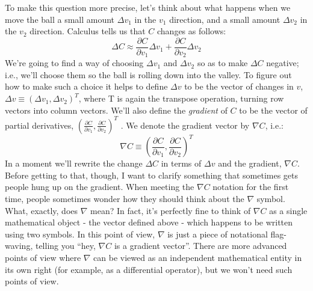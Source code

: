 To make this question more precise, let's think about what happens when we move the ball a small amount $\Delta v_1$ in the $v_1$ direction, and a small amount $\Delta v_2$ in the $v_2$ direction. Calculus tells us that $C$ changes as follows: 
\begin{equation}
\Delta C \approx \frac{\partial C}{\partial v_{1}} \Delta v_{1}+\frac{\partial C}{\partial v_{2}} \Delta v_{2}
\label{eq:deltaC01}
\end{equation}
We're going to find a way of choosing $\Delta v_1$ and $\Delta v_2$ so as to make $\Delta C$ negative; i.e., we'll choose them so the ball is rolling down into the valley. To figure out how to make such a choice it helps to define $\Delta v$ to be the vector of changes in $v$, $\Delta v \equiv\left(\Delta v_{1}, \Delta v_{2}\right)^{T}$, where T is again the transpose operation, turning row vectors into column vectors. We'll also define the \textit{gradient} of $C$ to be the vector of partial derivatives, $\left(\frac{\partial C}{\partial v_{1}}, \frac{\partial C}{\partial v_{2}}\right)^{T}$ . We denote the gradient vector by $\nabla C$, i.e.: 
\begin{equation}
\nabla C \equiv\left(\frac{\partial C}{\partial v_{1}}, \frac{\partial C}{\partial v_{2}}\right)^{T}
\end{equation}
In a moment we'll rewrite the change $\Delta C$ in terms of $\Delta v$ and the gradient, $\nabla C$. Before getting to that, though, I want to clarify something that sometimes gets people hung up on the gradient. When meeting the $\nabla C$ notation for the first time, people sometimes wonder how they should think about the $\nabla$ symbol. What, exactly, does $\nabla$ mean? In fact, it's perfectly fine to think of $\nabla C$ as a single mathematical object - the vector defined above - which happens to be written using two symbols. In this point of view, $\nabla $ is just a piece of notational flag-waving, telling you ``hey, $\nabla C$ is a gradient vector''. There are more advanced points of view where $\nabla $ can be viewed as an independent mathematical entity in its own right (for example, as a differential operator), but we won't need such points of view.


